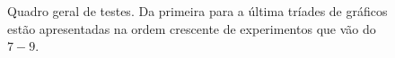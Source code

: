 \documentclass[journal, a4paper]{IEEEtran}
\begin{document}
\begin{figure}[ht!]
	\centering
    \quad %
    \quad %
    \caption{Quadro geral de testes. Da primeira para a última tríades de gráficos estão apresentadas na ordem crescente de experimentos que vão do $7-9$. }
\end{figure}
\end{document}
